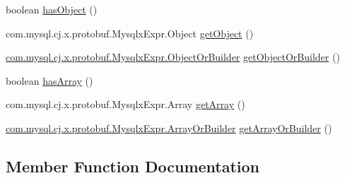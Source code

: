 \begin{DoxyCompactItemize}
\item 
boolean \mbox{\hyperlink{interfacecom_1_1mysql_1_1cj_1_1x_1_1protobuf_1_1_mysqlx_expr_1_1_expr_or_builder_a099cd4b017907a60a75f31f064bfcf93}{has\+Object}} ()
\item 
com.\+mysql.\+cj.\+x.\+protobuf.\+Mysqlx\+Expr.\+Object \mbox{\hyperlink{interfacecom_1_1mysql_1_1cj_1_1x_1_1protobuf_1_1_mysqlx_expr_1_1_expr_or_builder_aafb3431a33b96ed2d0c2830eb158c999}{get\+Object}} ()
\item 
\mbox{\hyperlink{interfacecom_1_1mysql_1_1cj_1_1x_1_1protobuf_1_1_mysqlx_expr_1_1_object_or_builder}{com.\+mysql.\+cj.\+x.\+protobuf.\+Mysqlx\+Expr.\+Object\+Or\+Builder}} \mbox{\hyperlink{interfacecom_1_1mysql_1_1cj_1_1x_1_1protobuf_1_1_mysqlx_expr_1_1_expr_or_builder_a8b74958f9c99a3c01fe8b763af748691}{get\+Object\+Or\+Builder}} ()
\item 
boolean \mbox{\hyperlink{interfacecom_1_1mysql_1_1cj_1_1x_1_1protobuf_1_1_mysqlx_expr_1_1_expr_or_builder_a4046952027aeade8aceba71642ca5d5c}{has\+Array}} ()
\item 
com.\+mysql.\+cj.\+x.\+protobuf.\+Mysqlx\+Expr.\+Array \mbox{\hyperlink{interfacecom_1_1mysql_1_1cj_1_1x_1_1protobuf_1_1_mysqlx_expr_1_1_expr_or_builder_a0b27af79eb76ffee7e3e667bb5a2d59c}{get\+Array}} ()
\item 
\mbox{\hyperlink{interfacecom_1_1mysql_1_1cj_1_1x_1_1protobuf_1_1_mysqlx_expr_1_1_array_or_builder}{com.\+mysql.\+cj.\+x.\+protobuf.\+Mysqlx\+Expr.\+Array\+Or\+Builder}} \mbox{\hyperlink{interfacecom_1_1mysql_1_1cj_1_1x_1_1protobuf_1_1_mysqlx_expr_1_1_expr_or_builder_a87057e8819488b45c0f8045f2315159d}{get\+Array\+Or\+Builder}} ()
\end{DoxyCompactItemize}


\subsection{Member Function Documentation}
\mbox{\label{interfacecom_1_1mysql_1_1cj_1_1x_1_1protobuf_1_1_mysqlx_expr_1_1_expr_or_builder_a0b27af79eb76ffee7e3e667bb5a2d59c}} 
